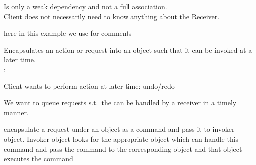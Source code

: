 \begin{figure}[H]	
  \centering
    \resizebox{\linewidth}{!}{\tikzset{font=\Huge}}
\end{figure}
\begin{figure}[H]	
  \centering
    \resizebox{\linewidth}{!}{\tikzset{font=\Huge}}
\end{figure}
\begin{notebox}\nospacing
  \begin{itemizenosep}
      \item 
  Is only a weak dependency and not a full association.\\
  Client does not necessarily need to know anything about the Receiver.
  \item here in this example we use \javainline{<<()>>} for comments 
  \end{itemizenosep}
\end{notebox}
\begin{intentbox}[Intention]
  Encapsulates an action or request into an object such that it can be invoked
  at a later time.\\:
  \begin{itemizenosep}
      \item Client wants to perform action at later time: undo/redo
      \item We want to queue requests s.t.\ the can be handled by a receiver in a
            timely manner.
  \end{itemizenosep}
 encapsulate a request under an object as a command and pass it to invoker object. Invoker object looks for the appropriate object which can handle this command and pass the command to the corresponding object and that object executes the command  
\end{intentbox}
